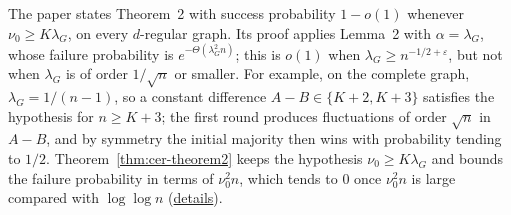 \begin{remark}\label{rem:cer-theorem2-form}
The paper states Theorem~2 with success probability $1-o(1)$ whenever $\nu_0\ge K\lambda_G$, on
every $d$-regular graph. Its proof applies Lemma~2 with $\alpha=\lambda_G$, whose failure
probability is $e^{-\Theta(\lambda_G^2n)}$; this is $o(1)$ when $\lambda_G\ge n^{-1/2+\varepsilon}$,
but not when $\lambda_G$ is of order $1/\sqrt n$ or smaller. For example, on the complete graph, $\lambda_G=1/(n-1)$, so a constant difference
$A-B\in\{K+2,K+3\}$ satisfies the hypothesis for $n\ge K+3$; the first round produces
fluctuations of order $\sqrt n$ in $A-B$, and by symmetry the initial majority then wins with
probability tending to $1/2$. Theorem~\ref{thm:cer-theorem2} keeps
the hypothesis $\nu_0\ge K\lambda_G$ and bounds the failure probability in terms of $\nu_0^2n$,
which tends to $0$ once $\nu_0^2n$ is large compared with $\log\log n$
(\href{https://github.com/formal-dynamics/leanamics/blob/main/median/FORMALIZATION_DIFFERENCES.md#theorem-2-the-formalized-form}{details}).
\end{remark}

